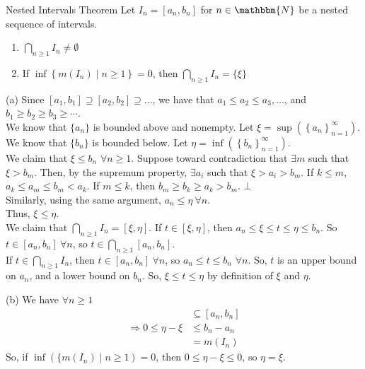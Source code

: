 \documentclass[10pt]{extarticle}
\newcommand{\N}{\mathbbm{N}}
\begin{document}
  \begin{problem}{Nested Intervals Theorem}
    Let $I_n = [a_n,b_n]$ for $n\in\N$ be a nested sequence of intervals.
    \begin{enumerate}[(1)]
      \item $\bigcap_{n \geq 1}I_n \neq \emptyset$
      \item If $\inf\left\{m(I_n)\mid n\geq 1\right\} = 0$, then $\bigcap_{n\geq 1} I_n = \{\xi\}$
    \end{enumerate}
    \tcblower
    \begin{problem}{(a)}
      Since $[a_1,b_1] \supseteq [a_2,b_2] \supseteq \dots$, we have that $a_1\leq a_2\leq a_3,\dots$, and $b_1 \geq b_2 \geq b_3 \geq \cdots$.\\

      We know that $\{a_n\}$ is bounded above and nonempty. Let $\xi = \sup\left(\left\{a_n\right\}_{n=1}^{\infty}\right)$.\\

      We know that $\{b_n\}$ is bounded below. Let $\eta = \inf\left(\left\{b_n\right\}_{n=1}^{\infty}\right)$.\\

      We claim that $\xi \leq b_n$ $\forall n \geq 1$. Suppose toward contradiction that $\exists m$ such that $\xi > b_m$. Then, by the supremum property, $\exists a_i$ such that $\xi > a_i > b_m$. If $k\leq m$, $a_k \leq a_m \leq b_m < a_k$. If $m \leq k$, then $b_m \geq b_k \geq a_k > b_m$. $\bot$\\

      Similarly, using the same argument, $a_n \leq \eta~\forall n$.\\

      Thus, $\xi \leq \eta$.\\

      We claim that $\bigcap_{n\geq 1} I_n = [\xi,\eta]$. If $t\in [\xi,\eta]$, then $a_n \leq \xi \leq t \leq \eta \leq b_n$. So $t\in [a_n,b_n]~\forall n$, so $t\in \bigcap_{n\geq 1} [a_n,b_n]$.\\

      If $t\in \bigcap_{n\geq 1}I_n$, then $t\in [a_n,b_n]~\forall n$, so $a_n \leq t \leq b_n$ $\forall n$. So, $t$ is an upper bound on $a_n$, and a lower bound on $b_n$. So, $\xi \leq t \leq \eta$ by definition of $\xi$ and $\eta$.
    \end{problem}
    \begin{problem}{(b)}
      We have $\forall n\geq 1$
      \begin{align*}
        [\xi,\eta] &\subseteq [a_n,b_n]\\
        \Rightarrow 0 \leq \eta-\xi &\leq b_n-a_n\\
                                    &= m(I_n)
      \end{align*}
      So, if $\inf\left(\{m(I_n)\mid n\geq 1\right) = 0$, then $0\leq \eta-\xi \leq 0$, so $\eta = \xi$.
    \end{problem}
  \end{problem}
\end{document}
